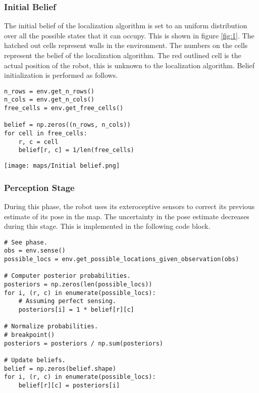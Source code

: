 \documentclass[a4paper,10pt]{article} %
\begin{document}
\hfill
\newpage

\subsubsection*{Initial Belief}

\begin{minipage}{0.5\textwidth}
    \flushleft
    The initial belief of the localization algorithm is set to an uniform distribution over all the possible states that it can occupy.
    This is shown in figure \ref{fig:1}.
    The hatched out cells represent walls in the environment.
    The numbers on the cells represent the belief of the localization algorithm.
    The red outlined cell is the actual position of the robot, this is unknown to the localization algorithm.
    Belief initialization is performed as follows.

    \begin{verbatim}
n_rows = env.get_n_rows()
n_cols = env.get_n_cols()
free_cells = env.get_free_cells()

belief = np.zeros((n_rows, n_cols))
for cell in free_cells:
    r, c = cell
    belief[r, c] = 1/len(free_cells)
    \end{verbatim}
\end{minipage} %
\hspace{0.05\textwidth} %
\begin{minipage}{0.4\textwidth}
    \texttt{[image: maps/Initial belief.png]}
    \label{fig:1}
\end{minipage}

\subsubsection*{Perception Stage}

During this phase, the robot uses its exteroceptive sensors to correct its previous estimate of its pose in the map.
The uncertainty in the pose estimate decreases during this stage.
This is implemented in the following code block.

\begin{verbatim}
# See phase.
obs = env.sense()
possible_locs = env.get_possible_locations_given_observation(obs)

# Computer posterior probabilities.
posteriors = np.zeros(len(possible_locs))
for i, (r, c) in enumerate(possible_locs):
    # Assuming perfect sensing.
    posteriors[i] = 1 * belief[r][c]

# Normalize probabilities.
# breakpoint()
posteriors = posteriors / np.sum(posteriors)

# Update beliefs.
belief = np.zeros(belief.shape)
for i, (r, c) in enumerate(possible_locs):
    belief[r][c] = posteriors[i]
\end{verbatim}
\end{document}
